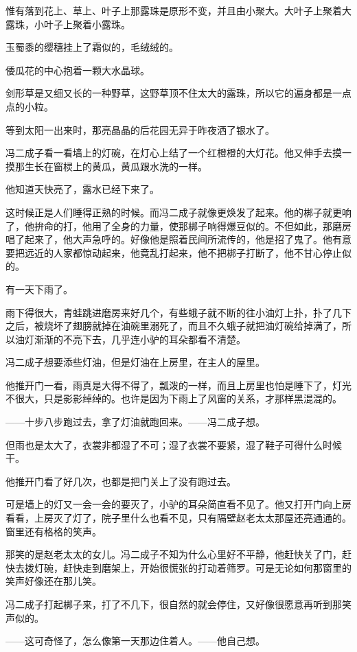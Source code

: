 \par 惟有落到花上、草上、叶子上那露珠是原形不变，并且由小聚大。大叶子上聚着大露珠，小叶子上聚着小露珠。
\par 玉蜀黍的缨穗挂上了霜似的，毛绒绒的。
\par 倭瓜花的中心抱着一颗大水晶球。
\par 剑形草是又细又长的一种野草，这野草顶不住太大的露珠，所以它的遍身都是一点点的小粒。
\par 等到太阳一出来时，那亮晶晶的后花园无异于昨夜洒了银水了。
\par 冯二成子看一看墙上的灯碗，在灯心上结了一个红橙橙的大灯花。他又伸手去摸一摸那生长在窗棂上的黄瓜，黄瓜跟水洗的一样。
\par 他知道天快亮了，露水已经下来了。
\par 这时候正是人们睡得正熟的时候。而冯二成子就像更焕发了起来。他的梆子就更响了，他拚命的打，他用了全身的力量，使那梆子响得爆豆似的。不但如此，那磨房唱了起来了，他大声急呼的。好像他是照着民间所流传的，他是招了鬼了。他有意要把远近的人家都惊动起来，他竟乱打起来，他不把梆子打断了，他不甘心停止似的。
\par 有一天下雨了。
\par 雨下得很大，青蛙跳进磨房来好几个，有些蛾子就不断的往小油灯上扑，扑了几下之后，被烧坏了翅膀就掉在油碗里溺死了，而且不久蛾子就把油灯碗给掉满了，所以油灯渐渐的不亮下去，几乎连小驴的耳朵都看不清楚。
\par 冯二成子想要添些灯油，但是灯油在上房里，在主人的屋里。
\par 他推开门一看，雨真是大得不得了，瓢泼的一样，而且上房里也怕是睡下了，灯光不很大，只是影影绰绰的。也许是因为下雨上了风窗的关系，才那样黑混混的。
\par ——十步八步跑过去，拿了灯油就跑回来。——冯二成子想。
\par 但雨也是太大了，衣裳非都湿了不可；湿了衣裳不要紧，湿了鞋子可得什么时候干。
\par 他推开门看了好几次，也都是把门关上了没有跑过去。
\par 可是墙上的灯又一会一会的要灭了，小驴的耳朵简直看不见了。他又打开门向上房看看，上房灭了灯了，院子里什么也看不见，只有隔壁赵老太太那屋还亮通通的。窗里还有格格的笑声。
\par 那笑的是赵老太太的女儿。冯二成子不知为什么心里好不平静，他赶快关了门，赶快去拨灯碗，赶快走到磨架上，开始很慌张的打动着筛罗。可是无论如何那窗里的笑声好像还在那儿笑。
\par 冯二成子打起梆子来，打了不几下，很自然的就会停住，又好像很愿意再听到那笑声似的。
\par ——这可奇怪了，怎么像第一天那边住着人。——他自己想。
